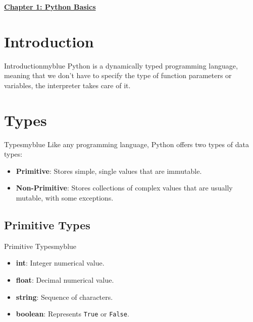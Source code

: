 \begin{center}
    \Huge{\textbf{\underline{Chapter 1: Python Basics}}}
\end{center}

\setcounter{section}{0}

\vspace{0.25cm}

\section{Introduction}
\begin{prettyBox}{Introduction}{myblue}
Python is a dynamically typed programming language, meaning that we don't  
have to specify the type of function parameters or variables, the interpreter  
takes care of it.
\end{prettyBox}

\vspace{0.45cm}

\section{Types}
\begin{prettyBox}{Types}{myblue}
Like any programming language, Python offers two types of data types:
\begin{itemize}
    \item \textbf{Primitive}: Stores simple, single values that are immutable.
    \item \textbf{Non-Primitive}: Stores collections of complex values that are usually mutable, with some exceptions.
\end{itemize}
\end{prettyBox}

\vspace{0.25cm}
\subsection{Primitive Types}
\begin{prettyBox}{Primitive Types}{myblue}
\begin{itemize}
    \item \textbf{int}: Integer numerical value.
    \item \textbf{float}: Decimal numerical value.
    \item \textbf{string}: Sequence of characters.
    \item \textbf{boolean}: Represents \texttt{True} or \texttt{False}.
\end{itemize}
\end{prettyBox}

